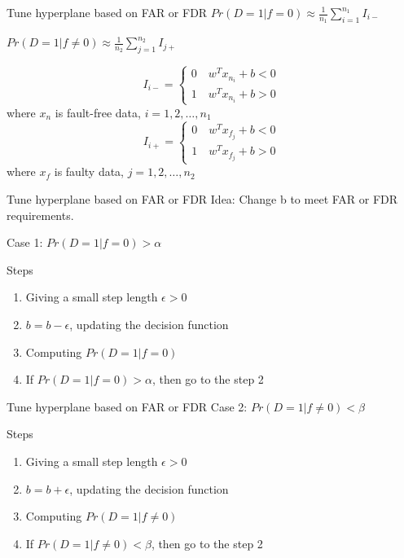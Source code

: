 \documentclass[10pt]{beamer}
\begin{document}
\begin{frame}{Tune hyperplane based on FAR or FDR}
$Pr(D=1|f=0) \approx \frac{1}{n_1}\sum_{i=1}^{n_1}I_{i-}$  \par
$Pr(D=1|f \neq 0) \approx          \frac{1}{n_2}\sum_{j=1}^{n_2}I_{j+}$ \par
\begin{equation}
I_{i-} = \left\{ \begin{aligned}
0 \quad  w^Tx_{n_i} + b < 0 \\
1 \quad w^Tx_{n_i} +b  > 0 
\end{aligned}
\right.
\end{equation}
where $x_n$ is fault-free data, $i=1,2,\dots,n_1$
\begin{equation}
I_{i+} = \left\{ \begin{aligned}
0 \quad  w^Tx_{f_j} + b < 0 \\
1 \quad w^Tx_{f_j} +b  > 0 
\end{aligned}
\right.
\end{equation}
where $x_f$ is faulty data, $j=1,2,\dots,n_2$
\end{frame}
\begin{frame}{Tune hyperplane based on FAR or FDR}
Idea: Change b to meet FAR or FDR requirements. \par
Case 1: $Pr(D=1|f=0) > \alpha$
\begin{exampleblock}{Steps}
      \begin{enumerate}
      \item Giving a small step length $\epsilon > 0$
      \item $b = b - \epsilon$, updating the decision function
      \item Computing  $Pr(D=1|f=0)$
      \item If  $Pr(D=1|f=0) > \alpha$, then go to the step 2 
 	 \end{enumerate}  
 	 \end{exampleblock}
\end{frame}

\begin{frame}{Tune hyperplane based on FAR or FDR}
    Case 2: $Pr(D=1|f\neq 0) < \beta$
\begin{exampleblock}{Steps}
      \begin{enumerate}
      \item Giving a small step length $\epsilon > 0$
      \item $b = b + \epsilon$, updating the decision function
      \item Computing  $Pr(D=1|f\neq 0)$
      \item If  $Pr(D=1|f\neq 0) < \beta$, then go to the step 2 
 	 \end{enumerate}  
 	 \end{exampleblock}
\end{frame}
\end{document}
